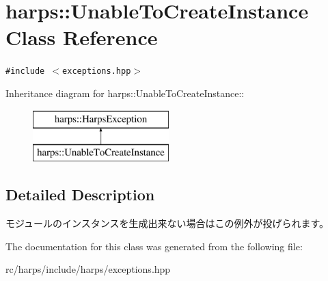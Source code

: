 \section{harps::UnableToCreateInstance Class Reference}
\label{classharps_1_1UnableToCreateInstance}
{\tt \#include $<$exceptions.hpp$>$}

Inheritance diagram for harps::UnableToCreateInstance::\begin{figure}[H]
\begin{center}
\leavevmode
\includegraphics[height=2cm]{classharps_1_1UnableToCreateInstance}
\end{center}
\end{figure}


\subsection{Detailed Description}
モジュールのインスタンスを生成出来ない場合はこの例外が投げられます。 

The documentation for this class was generated from the following file:\begin{CompactItemize}
\item 
rc/harps/include/harps/exceptions.hpp\end{CompactItemize}
